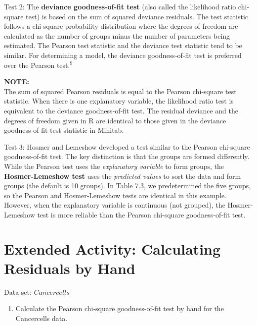 \documentclass[
]{report}
\providecommand{\tightlist}{%
  \setlength{\itemsep}{0pt}\setlength{\parskip}{0pt}}
\begin{document}
Test 2: The \textbf{deviance goodness‐of‐fit test} (also called the likelihood ratio chi‐square test) is based on the sum of squared deviance residuals. The test statistic follows a chi‐square probability distribution where the degrees of freedom are calculated as the number of groups minus the number of parameters being estimated. The Pearson test statistic and the deviance test statistic tend to be similar. For determining a model, the deviance goodness‐of‐fit test is preferred over the Pearson test.\(^9\)

\large

\textbf{NOTE:}\\
The sum of squared Pearson residuals is equal to the Pearson chi‐square test statistic. When there is one explanatory variable, the likelihood ratio test is equivalent to the deviance goodness‐of‐fit test. The residual deviance and the degrees of freedom given in R are identical to those given in the deviance goodness‐of‐fit test statistic in Minitab.\\
\normalsize

Test 3: Hosmer and Lemeshow developed a test similar to the Pearson chi‐square goodness‐of‐fit test. The key distinction is that the groups are formed differently. While the Pearson test uses the \emph{explanatory variable} to form groups, the \textbf{Hosmer‐Lemeshow test} uses the \emph{predicted values} to sort the data and form groups (the default is 10 groups). In Table 7.3, we predetermined the five groups, so the Pearson and Hosmer‐Lemeshow tests are identical in this example. However, when the explanatory variable is continuous (not grouped), the Hosmer‐Lemeshow test is more reliable than the Pearson chi‐square goodness‐of‐fit test.

\section*{Extended Activity: Calculating Residuals by Hand}\label{extended-activity-calculating-residuals-by-hand}

Data set: \(Cancercells\)

\begin{enumerate}
\def\labelenumi{\arabic{enumi}.}
\setcounter{enumi}{28}
\tightlist
\item
  Calculate the Pearson chi‐square goodness‐of‐fit test by hand for the Cancercells data.\\
\end{enumerate}
\end{document}
